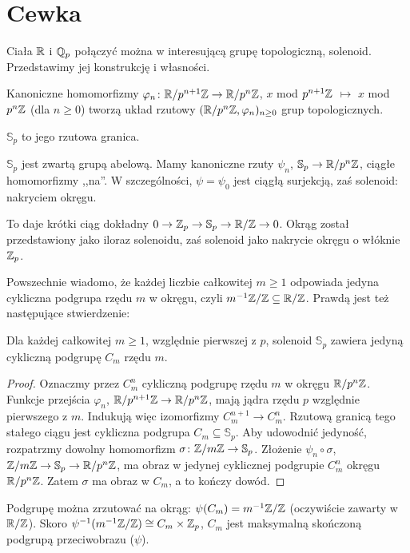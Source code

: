\section{Cewka}
Ciała $\mathbb R$ i $\mathbb Q_p$ połączyć można w interesującą grupę topologiczną, solenoid.
Przedstawimy jej konstrukcję i własności.

Kanoniczne homomorfizmy $\varphi_n \colon \mathbb R/p^{n+1} \mathbb Z \to \mathbb R/p^n\mathbb Z$, $x$ mod $p^{n+1} \mathbb Z$ $\mapsto$ $x$ mod $p^n \mathbb Z$ (dla $n \ge 0$) tworzą układ rzutowy $(\mathbb R/p^n \mathbb Z, \varphi_n)_{n \ge 0}$ grup topologicznych.

\begin{definicja}
	 $\mathbb S_p$ to jego rzutowa granica.
\end{definicja}

$\mathbb S_p$ jest zwartą grupą abelową.
Mamy kanoniczne rzuty $\psi_n$, $\mathbb S_p \to \mathbb R/p^n\mathbb Z$, ciągłe homomorfizmy ,,na''. W szczególności, $\psi = \psi_0$ jest ciągłą surjekcją, zaś solenoid: nakryciem okręgu.

To daje krótki ciąg dokładny $0 \to \mathbb Z_p \to \mathbb S_p \to \mathbb R/\mathbb Z \to 0$.
Okrąg został przedstawiony jako iloraz solenoidu, zaś solenoid jako nakrycie okręgu o włóknie $\mathbb Z_p$.

Powszechnie wiadomo, że każdej liczbie całkowitej $m \ge 1$ odpowiada jedyna cykliczna podgrupa rzędu $m$ w okręgu, czyli $m^{-1} \mathbb Z/\mathbb Z \subseteq \mathbb R/\mathbb Z$. Prawdą jest też następujące stwierdzenie:

\begin{fakt}
	Dla każdej całkowitej $m \ge 1$, względnie pierwszej z $p$, solenoid $\mathbb S_p$ zawiera jedyną cykliczną podgrupę $C_m$ rzędu $m$.
\end{fakt}

\begin{proof}
	Oznaczmy przez $C_m^n$ cykliczną podgrupę rzędu $m$ w okręgu $\mathbb R/p^n \mathbb Z$. 
	Funkcje przejścia $\varphi_n$, $\mathbb R/p^{n+1} \mathbb Z \to \mathbb R/p^n\mathbb Z$, mają jądra rzędu $p$ względnie pierwszego z $m$.
	Indukują więc izomorfizmy $C_m^{n+1} \to C_m^n$.
	Rzutową granicą tego stałego ciągu jest cykliczna podgrupa $C_m \subseteq \mathbb S_p$.
	Aby udowodnić jedyność, rozpatrzmy dowolny homomorfizm $\sigma \colon \mathbb Z/m\mathbb Z \to \mathbb S_p$.
	Złożenie $\psi_n \circ\sigma$, $\mathbb Z/m\mathbb Z \to \mathbb S_p \to \mathbb R/p^n \mathbb Z$, ma obraz w jedynej cyklicznej podgrupie $C_m^n$ okręgu $\mathbb R/p^n\mathbb Z$.
	Zatem $\sigma$ ma obraz w $C_m$, a to kończy dowód.
\end{proof}

Podgrupę można zrzutować na okrąg: $\psi(C_m) = m^{-1} \mathbb Z/\mathbb Z$ (oczywiście zawarty w $\mathbb R/\mathbb Z$).
Skoro $\psi^{-1} (m^{-1}\mathbb Z/\mathbb Z) \cong C_m \times \mathbb Z_p$, $C_m$ jest maksymalną skończoną podgrupą przeciwobrazu ($\psi$).

